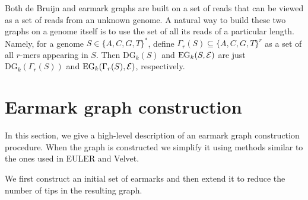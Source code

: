 \documentclass[12pt]{article}
\begin{document}
Both de Bruijn and earmark graphs are built on a set of reads that can be viewed as a 
set of reads from an unknown genome. A natural way to build these two graphs on a genome
itself is to use the set of all its reads of a particular length. Namely, 
for a genome $S \in \{A,C,G,T\}^*$, define $\Gamma_r(S) \subseteq \{A,C,G,T\}^r$
as a set of all $r$-mers appearing in $S$. Then $\textrm{DG}_k(S)$ and $\textrm{EG}_k(S, {\cal E})$
are just $\textrm{DG}_k(\Gamma_r(S))$ and $\textrm{EG}_k(\Gamma_r(S), {\cal E})$, respectively.




\section{Earmark graph construction}
In this section, we give a high-level description of an earmark graph construction procedure.
When the graph is constructed we simplify it using methods similar to the ones used in
EULER and Velvet.{}

We first construct an initial set of earmarks and then extend it to reduce the number of tips
in the resulting graph. 
\end{document}
